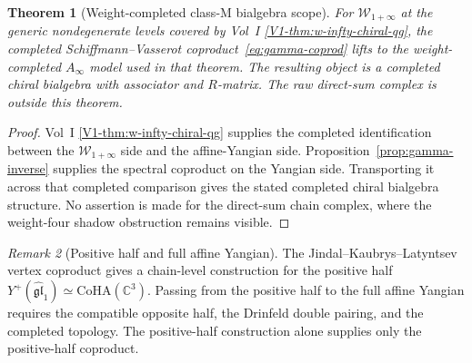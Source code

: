 \documentclass[11pt]{article}
\newtheorem{theorem}{Theorem}[section]
\theoremstyle{remark}
\newtheorem{remark}[theorem]{Remark}
\providecommand{\bC}{\mathbb{C}}
\providecommand{\fgl}{\mathfrak{gl}}
\providecommand{\Ainf}{A_\infty}
\begin{document}
\begin{theorem}[Weight-completed class-M bialgebra scope]
\label{thm:chain-level-coprod-weight-completed}%
For $\mathcal{W}_{1+\infty}$ at the generic nondegenerate levels
covered by Vol~I \ref*{V1-thm:w-infty-chiral-qg}, the completed
Schiffmann--Vasserot coproduct~\eqref{eq:gamma-coprod} lifts to the
weight-completed $\Ainf$ model used in that theorem.  The resulting
object is a completed chiral bialgebra with associator and
$R$-matrix.  The raw direct-sum complex is outside this theorem.
\end{theorem}

\begin{proof}
Vol~I \ref*{V1-thm:w-infty-chiral-qg} supplies the completed
identification between the $\mathcal W_{1+\infty}$ side and the
affine-Yangian side.  Proposition~\ref{prop:gamma-inverse} supplies
the spectral coproduct on the Yangian side.  Transporting it across
that completed comparison gives the stated completed chiral bialgebra
structure.  No assertion is made for the direct-sum chain complex,
where the weight-four shadow obstruction remains visible.
\end{proof}

\begin{remark}[Positive half and full affine Yangian]
The Jindal--Kaubrys--Latyntsev vertex coproduct gives a chain-level
construction for the positive half
$Y^+(\widehat{\fgl}_1)\simeq \mathrm{CoHA}(\bC^3)$.  Passing from the
positive half to the full affine Yangian requires the compatible
opposite half, the Drinfeld double pairing, and the completed
topology.  The positive-half construction alone supplies only the
positive-half coproduct.
\end{remark}


\end{document}
